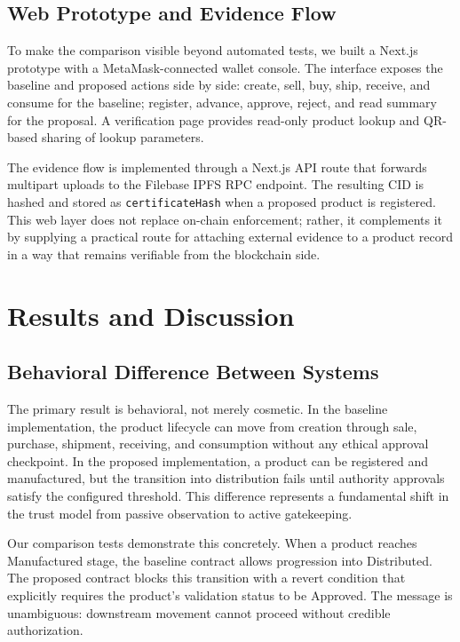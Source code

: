 \documentclass[conference]{IEEEtran}
\begin{document}
\subsection{Web Prototype and Evidence Flow}

To make the comparison visible beyond automated tests, we built a Next.js prototype with a MetaMask-connected wallet console. The interface exposes the baseline and proposed actions side by side: create, sell, buy, ship, receive, and consume for the baseline; register, advance, approve, reject, and read summary for the proposal. A verification page provides read-only product lookup and QR-based sharing of lookup parameters.

The evidence flow is implemented through a Next.js API route that forwards multipart uploads to the Filebase IPFS RPC endpoint. The resulting CID is hashed and stored as \texttt{certificateHash} when a proposed product is registered. This web layer does not replace on-chain enforcement; rather, it complements it by supplying a practical route for attaching external evidence to a product record in a way that remains verifiable from the blockchain side.

\section{Results and Discussion}

\subsection{Behavioral Difference Between Systems}

The primary result is behavioral, not merely cosmetic. In the baseline implementation, the product lifecycle can move from creation through sale, purchase, shipment, receiving, and consumption without any ethical approval checkpoint. In the proposed implementation, a product can be registered and manufactured, but the transition into distribution fails until authority approvals satisfy the configured threshold. This difference represents a fundamental shift in the trust model from passive observation to active gatekeeping.

Our comparison tests demonstrate this concretely. When a product reaches Manufactured stage, the baseline contract allows progression into Distributed. The proposed contract blocks this transition with a revert condition that explicitly requires the product's validation status to be Approved. The message is unambiguous: downstream movement cannot proceed without credible authorization.
\end{document}
